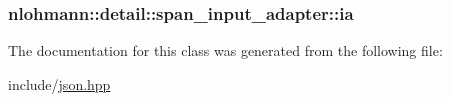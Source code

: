 \subsubsection[{\texorpdfstring{ia}{ia}}]{ nlohmann\+::detail\+::span\+\_\+input\+\_\+adapter\+::ia\hspace{0.3cm}{\ttfamily [private]}}\hypertarget{classnlohmann_1_1detail_1_1span__input__adapter_a3e223a7784502be20ace441e84f8cf43}{}\label{classnlohmann_1_1detail_1_1span__input__adapter_a3e223a7784502be20ace441e84f8cf43}


The documentation for this class was generated from the following file\+:\begin{DoxyCompactItemize}
\item 
include/\hyperlink{json_8hpp}{json.\+hpp}\end{DoxyCompactItemize}
